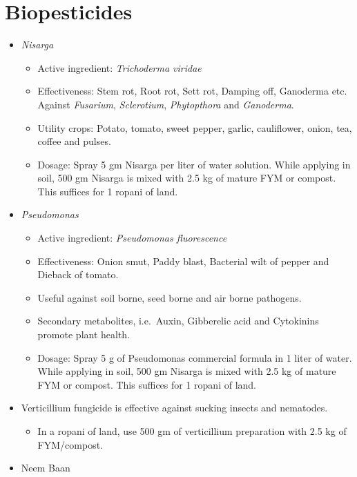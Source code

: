 \documentclass[
]{book}
\providecommand{\tightlist}{%
  \setlength{\itemsep}{0pt}\setlength{\parskip}{0pt}}
\begin{document}
\hypertarget{biopesticides}{%
\section{Biopesticides}\label{biopesticides}}

\begin{itemize}
\tightlist
\item
  \emph{Nisarga}

  \begin{itemize}
  \tightlist
  \item
    Active ingredient: \emph{Trichoderma viridae}
  \item
    Effectiveness: Stem rot, Root rot, Sett rot, Damping off, Ganoderma etc. Against \emph{Fusarium}, \emph{Sclerotium}, \emph{Phytopthora} and \emph{Ganoderma}.
  \item
    Utility crops: Potato, tomato, sweet pepper, garlic, cauliflower, onion, tea, coffee and pulses.
  \item
    Dosage: Spray 5 gm Nisarga per liter of water solution. While applying in soil, 500 gm Nisarga is mixed with 2.5 kg of mature FYM or compost. This suffices for 1 ropani of land.
  \end{itemize}
\item
  \emph{Pseudomonas}

  \begin{itemize}
  \tightlist
  \item
    Active ingredient: \emph{Pseudomonas fluorescence}
  \item
    Effectiveness: Onion smut, Paddy blast, Bacterial wilt of pepper and Dieback of tomato.
  \item
    Useful against soil borne, seed borne and air borne pathogens.
  \item
    Secondary metabolites, i.e.~Auxin, Gibberelic acid and Cytokinins promote plant health.
  \item
    Dosage: Spray 5 g of Pseudomonas commercial formula in 1 liter of water. While applying in soil, 500 gm Nisarga is mixed with 2.5 kg of mature FYM or compost. This suffices for 1 ropani of land.
  \end{itemize}
\item
  Verticillium fungicide is effective against sucking insects and nematodes.

  \begin{itemize}
  \tightlist
  \item
    In a ropani of land, use 500 gm of verticillium preparation with 2.5 kg of FYM/compost.
  \end{itemize}
\item
  Neem Baan


\end{itemize}
\end{document}
